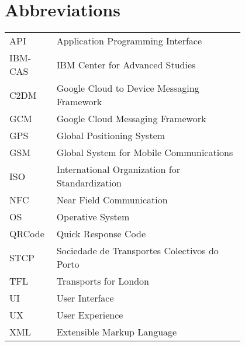 \chapter*{Abbreviations}

\begin{flushleft}
\begin{tabular}{l p{0.8\linewidth}}
API      & Application Programming Interface\\
IBM-CAS  & IBM Center for Advanced Studies \\
C2DM     & Google Cloud to Device Messaging Framework \\
GCM      & Google Cloud Messaging Framework \\
GPS      & Global Positioning System \\
GSM      & Global System for Mobile Communications \\
ISO      & International Organization for Standardization \\
NFC      & Near Field Communication \\
OS       & Operative System \\
QRCode   & Quick Response Code \\
STCP     & Sociedade de Transportes Colectivos do Porto \\
TFL      & Transports for London \\
UI       & User Interface \\
UX       & User Experience \\
XML      & Extensible Markup Language \\




\end{tabular}
\end{flushleft}


